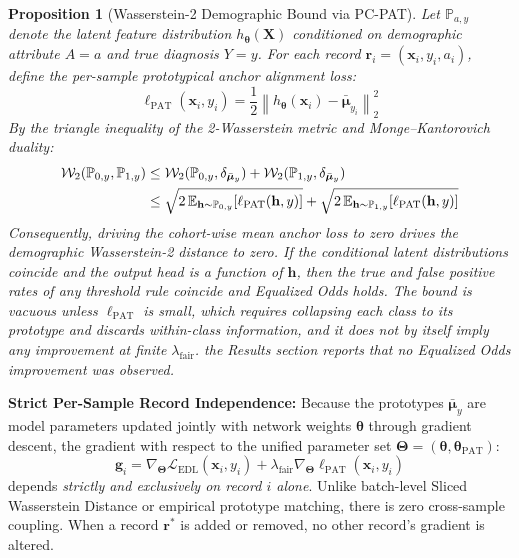 \documentclass[pdflatex,sn-vancouver-num,referee,lineno]{sn-jnl}
\theoremstyle{thmstyleone}
\newtheorem{proposition}[theorem]{Proposition}
\theoremstyle{thmstylethree}
\begin{document}
\begin{proposition}[Wasserstein-2 Demographic Bound via PC-PAT]
\label{prop:wasserstein_bound}
Let $\mathbb{P}_{a, y}$ denote the latent feature distribution $h_{\boldsymbol{\theta}}(\mathbf{X})$ conditioned on demographic attribute $A=a$ and true diagnosis $Y=y$. For each record $\mathbf{r}_i = (\mathbf{x}_i, y_i, a_i)$, define the per-sample prototypical anchor alignment loss:
\begin{equation}
    \ell_{\text{PAT}}(\mathbf{x}_i, y_i) = \frac{1}{2} \left\| h_{\boldsymbol{\theta}}(\mathbf{x}_i) - \bar{\boldsymbol{\mu}}_{y_i} \right\|_2^2
\end{equation}
By the triangle inequality of the 2-Wasserstein metric and Monge--Kantorovich duality:
\begin{align}
    \mathcal{W}_2(\mathbb{P}_{0, y}, \mathbb{P}_{1, y}) &\le \mathcal{W}_2(\mathbb{P}_{0, y}, \delta_{\bar{\boldsymbol{\mu}}_y}) + \mathcal{W}_2(\mathbb{P}_{1, y}, \delta_{\bar{\boldsymbol{\mu}}_y}) \notag \\
    &\le \sqrt{2 \, \mathbb{E}_{\mathbf{h} \sim \mathbb{P}_{0, y}} [\ell_{\text{PAT}}(\mathbf{h}, y)]} + \sqrt{2 \, \mathbb{E}_{\mathbf{h} \sim \mathbb{P}_{1, y}} [\ell_{\text{PAT}}(\mathbf{h}, y)]}
\end{align}
Consequently, driving the cohort-wise mean anchor loss to zero drives the demographic Wasserstein-2 distance to zero. If the conditional latent distributions coincide and the output head is a function of $\mathbf{h}$, then the true and false positive rates of any threshold rule coincide and Equalized Odds holds. The bound is vacuous unless $\ell_{\text{PAT}}$ is small, which requires collapsing each class to its prototype and discards within-class information, and it does not by itself imply any improvement at finite $\lambda_{\text{fair}}$. the Results section reports that no Equalized Odds improvement was observed.
\end{proposition}

\noindent \textbf{Strict Per-Sample Record Independence:} Because the prototypes $\bar{\boldsymbol{\mu}}_y$ are model parameters updated jointly with network weights $\boldsymbol{\theta}$ through gradient descent, the gradient with respect to the unified parameter set $\boldsymbol{\Theta} = (\boldsymbol{\theta}, \boldsymbol{\theta}_{\text{PAT}})$:
\begin{equation}
    \mathbf{g}_i = \nabla_{\boldsymbol{\Theta}} \mathcal{L}_{\text{EDL}}(\mathbf{x}_i, y_i) + \lambda_{\text{fair}} \nabla_{\boldsymbol{\Theta}} \ell_{\text{PAT}}(\mathbf{x}_i, y_i)
\end{equation}
depends \emph{strictly and exclusively on record $i$ alone}. Unlike batch-level Sliced Wasserstein Distance or empirical prototype matching, there is zero cross-sample coupling. When a record $\mathbf{r}^*$ is added or removed, no other record's gradient is altered.
\end{document}
